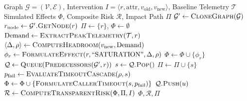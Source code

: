 \documentclass[conference]{IEEEtran}
\begin{document}
\begin{algorithm}[t]
\caption{Pre-Deployment Counterfactual Simulation}
\label{alg:counterfactual}
\begin{algorithmic}[1]
\Require Graph $\mathcal{G} = (\mathcal{V}, \mathcal{E})$, Intervention $I = \langle r, \text{attr}, v_{\text{old}}, v_{\text{new}} \rangle$, Baseline Telemetry $\mathcal{T}$
\Ensure Simulated Effects $\Phi$, Composite Risk $\mathcal{R}$, Impact Path $\Pi$
\State $\mathcal{G}' \gets \textsc{CloneGraph}(\mathcal{G})$ 
\State $r_{\text{node}} \gets \mathcal{G}'\textsc{.GetNode}(r)$
\State $\Pi \gets \{r\}$, $\Phi \gets \emptyset$
\State $\text{Demand} \gets \textsc{ExtractPeakTelemetry}(\mathcal{T}, r)$
\State $\langle \Delta, \rho \rangle \gets \textsc{ComputeHeadroom}(v_{\text{new}}, \text{Demand})$
 
    \State $\phi_r \gets \textsc{FormulateEffect}(r, \text{``SATURATION''}, \Delta, \rho)$
    \State $\Phi \gets \Phi \cup \{\phi_r\}$
    \State $\mathcal{Q} \gets \textsc{Queue}(\textsc{Predecessors}(\mathcal{G}', r))$
        \State $s \gets \mathcal{Q}\textsc{.Pop}()$
        \State $\Pi \gets \Pi \cup \{s\}$
        \State $p_{\text{fail}} \gets \textsc{EvaluateTimeoutCascade}(\rho, s)$
        \State $\Phi \gets \Phi \cup \{\textsc{FormulateCallerTimeout}(s, p_{\text{fail}})\}$
             $\mathcal{Q}\textsc{.Push}(u)$ \EndIf
        \EndFor
    \EndWhile
\EndIf
\State $\mathcal{R} \gets \textsc{ComputeTransparentRisk}(\Phi, \Pi, I)$
\State \Return $\Phi, \mathcal{R}, \Pi$
\end{algorithmic}
\end{algorithm}
\end{document}
